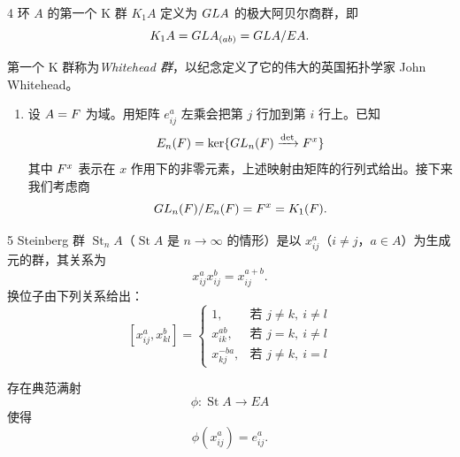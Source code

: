 
\begin{defn}{4}
环 $A$ 的第一个 K 群 $K_1A$ 定义为 $GL A$ 的极大阿贝尔商群，即
\[
  K_1A = GL A_{(ab)} = GL A/EA.
\]
\end{defn}

第一个 K 群称为\emph{Whitehead 群}，以纪念定义了它的伟大的英国拓扑学家 John Whitehead。

\begin{enumerate}[label=\arabic*.]
\item 设 $A=F$ 为域。用矩阵 $e_{ij}^a$ 左乘会把第 $j$ 行加到第 $i$ 行上。已知
\[
  E_n(F) = \operatorname{ker}\{GL_n(F) \xrightarrow{\det} F^x\}
\]
其中 $F^x$ 表示在 $x$ 作用下的非零元素，上述映射由矩阵的行列式给出。接下来我们考虑商
\[
  GL_n(F)/E_n(F) = F^x = K_1(F).
\]
\end{enumerate}

\begin{defn}{5}
Steinberg 群 $\operatorname{St}_nA$（$\operatorname{St}A$ 是 $n\to\infty$ 的情形）是以 $x_{ij}^a$（$i\ne j$，$a\in A$）为生成元的群，其关系为
\[
  x_{ij}^a x_{ij}^b = x_{ij}^{a+b}.
\]
换位子由下列关系给出：
\[
  [x_{ij}^a, x_{kl}^b] =
  \begin{cases}
    1, & \text{若 } j\ne k,\ i\ne l \\
    x_{ik}^{ab}, & \text{若 } j=k,\ i\ne l \\
    x_{kj}^{-ba}, & \text{若 } j\ne k,\ i=l
  \end{cases}
\]
\end{defn}

存在典范满射
\[
  \phi : \operatorname{St}A \to EA
\]
使得
\[
  \phi(x_{ij}^a) = e_{ij}^a.
\]

